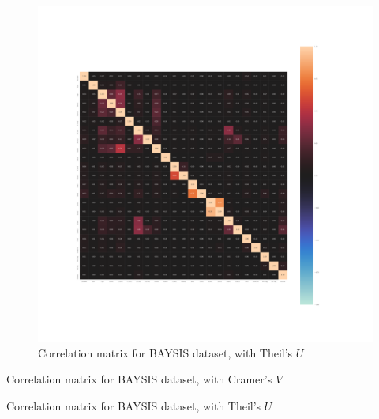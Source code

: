 \documentclass[a4paper,12pt]{report}
\newcommand{\nocontentsline}[3]{}
\newcommand{\tocless}[2]{\bgroup\let\addcontentsline=\nocontentsline#1{#2}\egroup}
\begin{document}
\begin{appendices}
\label{appendix_baysis_dataset_corr_theils}
\begin{figure}[h]
	\centering
	\includegraphics[scale=0.4]{../CorrAnalysis/data/BAYSIS/01_dataset/plots/baysis_dataset_corr_theils}
	\caption{Correlation matrix for BAYSIS dataset, with Theil's $U$}
	\label{img:appendix_correlation_matrix_dataset_theils}
\end{figure}
\restoregeometry

\begin{table} %
\tiny
\setlength{\tabcolsep}{4pt}
\centering

\caption{Correlation matrix for BAYSIS dataset, with Cramer's $V$}
\end{table} %

\begin{table} %
\tiny
\setlength{\tabcolsep}{4pt}
\centering

\caption{Correlation matrix for BAYSIS dataset, with Theil's $U$}
\end{table} %


\end{appendices}
\end{document}
